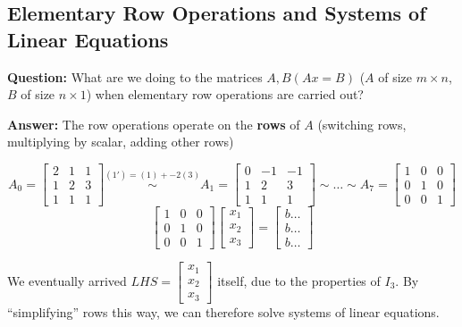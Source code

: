 
\subsection{Elementary Row Operations and Systems of Linear Equations}
\textbf{Question:} What are we doing to the matrices \(A, B (Ax = B)\) (\(A\) of size \(m \times n\), \(B\) of size \(n \times 1\)) when elementary row operations are carried out?

\textbf{Answer:} The row operations operate on the \textbf{rows} of \(A\) (switching rows, multiplying by scalar, adding other rows)

\begin{example}
    \[
        A_0 = \begin{bmatrix}
                2 & 1 & 1 \\
                1 & 2 & 3 \\
                1 & 1 & 1
            \end{bmatrix}
        \overset{(1') = (1) + -2(3)}{\sim}
        A_1 = \begin{bmatrix}
                0 & -1 & -1 \\
                1 & 2  & 3  \\
                1 & 1  & 1
            \end{bmatrix}
        \sim \dots \sim
        A_7 = \begin{bmatrix}
                1 & 0 & 0 \\
                0 & 1 & 0 \\
                0 & 0 & 1
            \end{bmatrix}
    \]
    \[
        \begin{bmatrix}
                1 & 0 & 0 \\
                0 & 1 & 0 \\
                0 & 0 & 1
            \end{bmatrix}
        \begin{bmatrix}
                x_1 \\
                x_2 \\
                x_3
            \end{bmatrix} =
        \begin{bmatrix}
                b \dots \\
                b \dots \\
                b \dots
            \end{bmatrix}
    \]

    We eventually arrived \(LHS = \begin{bmatrix}
            x_1 \\
            x_2 \\
            x_3
        \end{bmatrix}\) itself, due to the properties of \(I_3\). By ``simplifying'' rows this way, we can therefore solve systems of linear equations.
\end{example}

